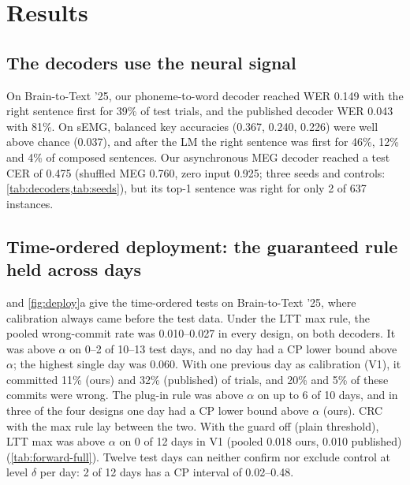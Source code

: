 \section{Results}
\label{sec:results}

\subsection{The decoders use the neural signal}
\label{sec:res-decoders}
On Brain-to-Text '25, our phoneme-to-word decoder reached WER 0.149 with the right sentence first for 39\% of test trials, and the published decoder WER 0.043 with 81\%. On sEMG, balanced key accuracies (0.367, 0.240, 0.226) were well above chance (0.037), and after the LM the right sentence was first for 46\%, 12\% and 4\% of composed sentences. Our asynchronous MEG decoder reached a test CER of 0.475 (shuffled MEG 0.760, zero input 0.925; three seeds and controls: \cref{tab:decoders,tab:seeds}), but its top-1 sentence was right for only 2 of 637 instances.

\subsection{Time-ordered deployment: the guaranteed rule held across days}
\label{sec:res-forward}
 and \cref{fig:deploy}a give the time-ordered tests on Brain-to-Text '25, where calibration always came before the test data. Under the LTT max rule, the pooled wrong-commit rate was 0.010--0.027 in every design, on both decoders. It was above $\alpha$ on 0--2 of 10--13 test days, and no day had a CP lower bound above $\alpha$; the highest single day was 0.060. With one previous day as calibration (V1), it committed 11\% (ours) and 32\% (published) of trials, and 20\% and 5\% of these commits were wrong. The plug-in rule was above $\alpha$ on up to 6 of 10 days, and in three of the four designs one day had a CP lower bound above $\alpha$ (ours). CRC with the max rule lay between the two. With the guard off (plain threshold), LTT max was above $\alpha$ on 0 of 12 days in V1 (pooled 0.018 ours, 0.010 published) (\cref{tab:forward-full}). Twelve test days can neither confirm nor exclude control at level $\delta$ per day: 2 of 12 days has a CP interval of 0.02--0.48.

